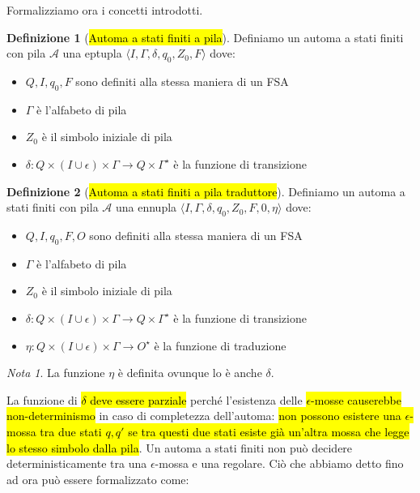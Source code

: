 \documentclass[a4paper,11pt,oneside]{article}
\theoremstyle{plain}
\theoremstyle{definition}
\newtheorem{defn}{Definizione}[section]
\theoremstyle{remark}
\newtheorem*{nota}{Nota}
\begin{document}
Formalizziamo ora i concetti introdotti.

\begin{defn}[\hl{Automa a stati finiti a pila}]\label{defn:automa-pila}
  Definiamo un automa a stati finiti con pila $\mathcal{A}$ una eptupla
  $\langle I, \Gamma, \delta, q_0, Z_0, F \rangle$ dove:

  \begin{itemize}
    \item $Q, I, q_0, F$ sono definiti alla stessa maniera di un FSA
    \item $\Gamma$ è l'alfabeto di pila
    \item $Z_0$ è il simbolo iniziale di pila
    \item
      $\delta: Q \times (I \cup \epsilon) \times \Gamma \to Q \times \Gamma^\star$
      è la funzione di transizione
  \end{itemize}
\end{defn}

\begin{defn}[\hl{Automa a stati finiti a pila traduttore}]\label{defn:automa-pila-trad}
  Definiamo un automa a stati finiti con pila $\mathcal{A}$ una ennupla
  $\langle I, \Gamma, \delta, q_0, Z_0, F, 0, \eta \rangle$ dove:

  \begin{itemize}
    \item $Q, I, q_0, F, O$ sono definiti alla stessa maniera di un FSA
    \item $\Gamma$ è l'alfabeto di pila
    \item $Z_0$ è il simbolo iniziale di pila
    \item
      $\delta: Q \times (I \cup \epsilon) \times \Gamma \to Q \times \Gamma^\star$
      è la funzione di transizione
    \item $\eta: Q \times (I \cup \epsilon) \times \Gamma \to O^\star$ è la
      funzione di traduzione
  \end{itemize}
\end{defn}

\begin{nota}
  La funzione $\eta$ è definita ovunque lo è anche $\delta$.
\end{nota}

La funzione di \hl{$\delta$ deve essere parziale} perché l'esistenza delle
\hl{$\epsilon$-mosse causerebbe non-determinismo} in caso di completezza
dell'automa: \hl{non possono esistere una $\epsilon$-mossa tra due stati $q, q'$
se tra questi due stati esiste già un'altra mossa che legge lo stesso simbolo
dalla pila}. Un automa a stati finiti non può decidere deterministicamente tra
una $\epsilon$-mossa e una regolare. Ciò che abbiamo detto fino ad ora può
essere formalizzato come:
\end{document}
